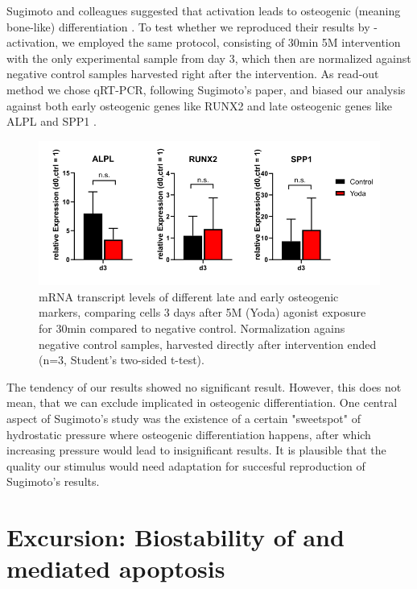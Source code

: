 Sugimoto and colleagues suggested that \Piezo{} activation leads to osteogenic (meaning bone-like) differentiation \cite{Sugimoto2017}. To test whether we reproduced their results by \Piezo{}-activation, we employed the same protocol, consisting of 30min 5\textmu{}M \Yoda{} intervention with the only experimental sample from day 3, which then are normalized against negative control samples harvested right after the intervention. As read-out method we chose qRT-PCR, following Sugimoto's paper, and biased our analysis against both early osteogenic genes like RUNX2 and late osteogenic genes like ALPL and SPP1 \cite{Marom2005, Creecy2013}. \par


\begin{figure}[htbp]
	\centering
	\includegraphics[width = \linewidth]{Osteogenic_PCR_Yoda.png}
	\caption{mRNA transcript levels of different late and early osteogenic markers, comparing cells 3 days after 5\textmu{}M (Yoda) \Piezo{} agonist exposure for 30min compared to negative control. Normalization agains negative control samples, harvested directly after intervention ended (n=3, Student's two-sided t-test).}
	\label{fig:Osteo_PCR}
\end{figure}
 

The tendency of our results showed no significant result. However, this does not mean, that we can exclude \Piezo{} implicated in osteogenic differentiation. One central aspect of Sugimoto's study was the existence of a certain "sweetspot" of hydrostatic pressure where osteogenic differentiation happens, after which increasing pressure would lead to insignificant results. It is plausible that the quality our \Piezo{} stimulus would need adaptation for succesful reproduction of Sugimoto's results.



\section{Excursion: Biostability of \Yoda{} and \Piezo{} mediated apoptosis}
\label{sec:biostability}


